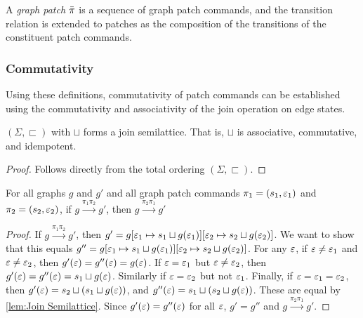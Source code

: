 A \textit{graph patch} $\bar{\pi}$ is a sequence of graph patch commands, and the transition relation is extended to patches as the composition of the transitions of the constituent patch commands. 

\subsubsection{Commutativity}%
\label{subsub:Commutativity:formal}

Using these definitions, commutativity of patch commands can be established using the commutativity and associativity of the join operation on edge states. 

\begin{lemma}
  \label{lem:Join Semilattice}
  $(\Sigma, \sqsubset)$ with $\sqcup$ forms a join semilattice. That is, $\sqcup$ is associative, commutative, and idempotent. 
\end{lemma}
\begin{proof}
    Follows directly from the total ordering $(\Sigma, \sqsubset)$. 
\end{proof}

\begin{theorem}[Commutativity]
  \label{thm:Commutativity}
  For all graphs $g$ and $g'$ and all graph patch commands $\pi_1 = (s_1, \varepsilon_1)$ and  $\pi_2 = (s_2, \varepsilon_2)$, 
  if $g \overset{\pi_1 \pi_2}{\longrightarrow} g'$,
  then $g \overset{\pi_2 \pi_1}{\longrightarrow} g'$
\end{theorem}
\begin{proof}
  If $g \overset{\pi_1 \pi_2}{\longrightarrow} g'$, then $g' = g[\varepsilon_1 \mapsto s_1 \sqcup g(\varepsilon_1)][\varepsilon_2 \mapsto s_2 \sqcup g(\varepsilon_2)]$. We want to show that this equals $g'' = g[\varepsilon_1 \mapsto s_1 \sqcup g(\varepsilon_1)][\varepsilon_2 \mapsto s_2 \sqcup g(\varepsilon_2)]$. For any $\varepsilon$, if $\varepsilon \neq \varepsilon_1$ and $\varepsilon \neq \varepsilon_2$, then $g'(\varepsilon) = g''(\varepsilon) = g(\varepsilon)$. If $\varepsilon = \varepsilon_1$ but $\varepsilon\neq \varepsilon_2$, then $g'(\varepsilon) = g''(\varepsilon) = s_1 \sqcup g(\varepsilon)$. Similarly if $\varepsilon=\varepsilon_2$ but not $\varepsilon_1$. Finally, if $\varepsilon=\varepsilon_1=\varepsilon_2$, then $g'(\varepsilon)=s_2\sqcup(s_1\sqcup g(\varepsilon))$, and $g''(\varepsilon)=s_1\sqcup(s_2\sqcup g(\varepsilon))$. These are equal by \autoref{lem:Join Semilattice}. Since $g'(\varepsilon) = g''(\varepsilon)$ for all $\varepsilon$, $g' = g''$ and  $g \overset{\pi_2 \pi_1}{\longrightarrow} g'$.
\end{proof}

